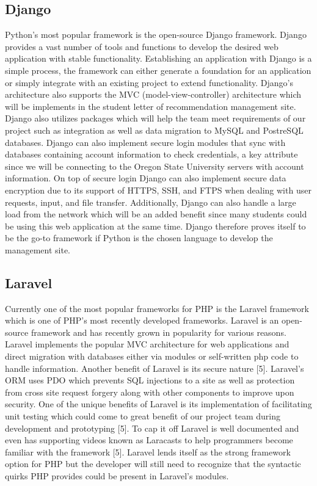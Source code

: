\documentclass[onecolumn, draftclsnofoot,10pt, compsoc]{IEEEtran}
\begin{document}
\subsection{Django}
Python’s most popular framework is the open-source Django framework. Django provides a vast number of tools and functions to develop the desired web application with stable functionality. Establishing an application with Django is a simple process, the framework can either generate a foundation for an application or simply integrate with an existing project to extend functionality. Django’s architecture also supports the MVC (model-view-controller) architecture which will be implements in the student letter of recommendation management site. Django also utilizes packages which will help the team meet requirements of our project such as integration as well as data migration to MySQL and PostreSQL databases. Django can also implement secure login modules that sync with databases containing account information to check credentials, a key attribute since we will be connecting to the Oregon State University servers with account information.  On top of secure login Django can also implement secure data encryption due to its support of HTTPS, SSH, and FTPS when dealing with user requests, input, and file transfer. Additionally, Django can also handle a large load from the network which will be an added benefit since many students could be using this web application at the same time. Django therefore proves itself to be the go-to framework if Python is the chosen language to develop the management site.

\subsection{Laravel}
Currently one of the most popular frameworks for PHP is the Laravel framework which is one of PHP’s most recently developed frameworks. Laravel is an open-source framework and has recently grown in popularity for various reasons. Laravel implements the popular MVC architecture for web applications and direct migration with databases either via modules or self-written php code to handle information. Another beneﬁt of Laravel is its secure nature [5]. Laravel’s ORM uses PDO which prevents SQL injections to a site as well as protection from cross site request forgery along with other components to improve upon security. One of the unique beneﬁts of Laravel is its implementation of facilitating unit testing which could come to great beneﬁt of our project team during development and prototyping [5]. To cap it off Laravel is well documented and even has supporting videos known as Laracasts to help programmers become familiar with the framework [5]. Laravel lends itself as the strong framework option for PHP but the developer will still need to recognize that the syntactic quirks PHP provides could be present in Laravel’s modules. 
\end{document}
